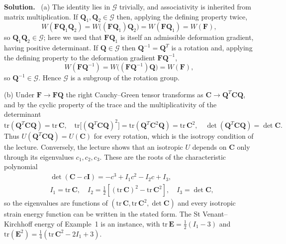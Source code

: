 \documentclass[a4paper,12pt]{paper}
\newenvironment{solution}{\par\noindent\textbf{Solution.}\ }{\par\medskip}
\begin{document}
\begin{solution}
(a) The identity lies in $\mathcal{G}$ trivially, and associativity is inherited from matrix
multiplication. If $\mathbf{Q}_{1},\mathbf{Q}_{2}\in\mathcal{G}$ then, applying the defining
property twice,
\begin{equation}
W(\mathbf{F}\mathbf{Q}_{1}\mathbf{Q}_{2})=W\big((\mathbf{F}\mathbf{Q}_{1})\mathbf{Q}_{2}\big)
=W(\mathbf{F}\mathbf{Q}_{1})=W(\mathbf{F}),
\label{eq:18}
\end{equation}
so $\mathbf{Q}_{1}\mathbf{Q}_{2}\in\mathcal{G}$; here we used that $\mathbf{F}\mathbf{Q}_{1}$ is
itself an admissible deformation gradient, having positive determinant. If $\mathbf{Q}\in\mathcal{G}$
then $\mathbf{Q}^{-1}=\mathbf{Q}^{T}$ is a rotation and, applying the defining property to the
deformation gradient $\mathbf{F}\mathbf{Q}^{-1}$,
\begin{equation}
W(\mathbf{F}\mathbf{Q}^{-1})=W\big((\mathbf{F}\mathbf{Q}^{-1})\mathbf{Q}\big)=W(\mathbf{F}),
\label{eq:19}
\end{equation}
so $\mathbf{Q}^{-1}\in\mathcal{G}$. Hence $\mathcal{G}$ is a subgroup of the rotation group.

(b) Under $\mathbf{F}\rightarrow\mathbf{F}\mathbf{Q}$ the right Cauchy--Green tensor transforms as
$\mathbf{C}\rightarrow\mathbf{Q}^{T}\mathbf{C}\mathbf{Q}$, and by the cyclic property of the trace
and the multiplicativity of the determinant
\begin{equation}
\mathrm{tr}(\mathbf{Q}^{T}\mathbf{C}\mathbf{Q})=\mathrm{tr}\,\mathbf{C},\quad
\mathrm{tr}\big[(\mathbf{Q}^{T}\mathbf{C}\mathbf{Q})^{2}\big]=\mathrm{tr}(\mathbf{Q}^{T}\mathbf{C}^{2}\mathbf{Q})=\mathrm{tr}\,\mathbf{C}^{2},\quad
\det(\mathbf{Q}^{T}\mathbf{C}\mathbf{Q})=\det\mathbf{C}.
\label{eq:20}
\end{equation}
Thus $U(\mathbf{Q}^{T}\mathbf{C}\mathbf{Q})=U(\mathbf{C})$ for every rotation, which is the
isotropy condition of the lecture. Conversely, the lecture shows that an isotropic $U$ depends on
$\mathbf{C}$ only through its eigenvalues $c_{1},c_{2},c_{3}$. These are the roots of the
characteristic polynomial
\begin{equation}
\begin{split}
&\det(\mathbf{C}-c\mathbf{I})=-c^{3}+I_{1}c^{2}-I_{2}c+I_{3},\\
&I_{1}=\mathrm{tr}\,\mathbf{C},\quad I_{2}=\frac{1}{2}\left[(\mathrm{tr}\,\mathbf{C})^{2}-\mathrm{tr}\,\mathbf{C}^{2}\right],\quad
I_{3}=\det\mathbf{C},
\end{split}
\label{eq:21}
\end{equation}
so the eigenvalues are functions of $(\mathrm{tr}\,\mathbf{C},\mathrm{tr}\,\mathbf{C}^{2},\det\mathbf{C})$
and every isotropic strain energy function can be written in the stated form. The St
Venant--Kirchhoff energy of Example~1 is an instance, with
$\mathrm{tr}\,\mathbf{E}=\frac{1}{2}(I_{1}-3)$ and $\mathrm{tr}(\mathbf{E}^{2})=\frac{1}{4}(\mathrm{tr}\,\mathbf{C}^{2}-2I_{1}+3)$.


\end{solution}
\end{document}
